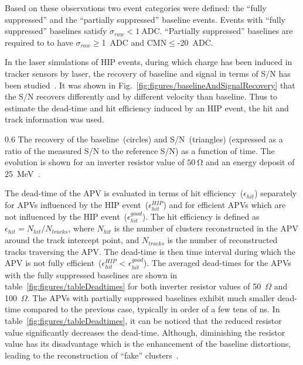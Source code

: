 Based on these observations two event categories were defined: the ``fully suppressed'' and the ``partially suppressed'' baseline events. Events with ``fully suppressed'' baselines satisfy $\sigma_{raw}< 1~\mathrm{ADC}$. ``Partially suppressed'' baselines are required to to have $\sigma_{raw}\geq$1~ADC and CMN$\leq$-20~ADC.

In the laser simulations of HIP events, during which charge has been induced in tracker sensors by laser, the recovery of baseline and signal in terms of S/N has been studied~\cite{Adam:2005pz}. It was shown in Fig.~\ref{fig:figures/baselineAndSignalRecovery} that the S/N recovers differently and by different velocity than baseline. Thus to estimate the dead-time and hit efficiency induced by an HIP event, the hit and track information was used.

                 {0.6}       %
                 {The recovery of the baseline~(circles) and S/N~(triangles) (expressed as a ratio of the measured S/N to the reference S/N) as a function of time. The evolution is shown for an inverter resistor value of $50~\mathrm{\Omega}$ and an energy deposit of 25~MeV~\cite{Adam:2005pz}.} %

The dead-time of the APV is evaluated in terms of hit efficiency~($\epsilon_{hit}$) separately for APVs influenced by the HIP event~($\epsilon_{hit}^{HIP}$) and for efficient APVs which are not influenced by the HIP event~($\epsilon_{hit}^{good}$). The hit efficiency is defined as $\epsilon_{hit} = N_{hit}/N_{tracks}$, where $N_{hit}$ is the number of clusters reconstructed in the APV around the track intercept point, and $N_{tracks}$ is the number of reconstructed tracks traversing the APV. The dead-time is then time interval during which the APV is not fully efficient~($\epsilon_{hit}^{HIP}$ < $\epsilon_{hit}^{good}$). The averaged dead-times for the APVs with the fully suppressed baselines are shown in table~\ref{fig:figures/tableDeadtimes} for both inverter resistor values of 50~$\Omega$ and 100~$\Omega$. The APVs with partially suppressed baselines exhibit much smaller dead-time compared to the previous case, typically in order of a few tens of ns. In table~\ref{fig:figures/tableDeadtimes}, it can be noticed that the reduced resistor value significantly decreases the dead-time. Although, diminishing the resistor value has its disadvantage which is the enhancement of the baseline distortions, leading to the reconstruction of ``fake'' clusters~\cite{Bainbridge:2004jc}.


